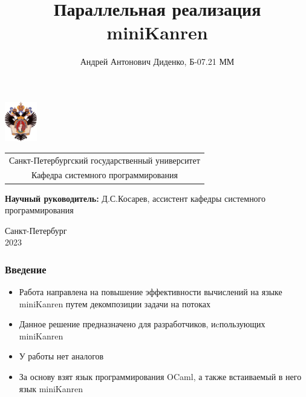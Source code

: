 \documentclass[aspectratio=169]{beamer}
\title[Параллелизация miniKanren]{Параллельная реализация miniKanren}
\institute[СПбГУ]{}
\author[Андрей Диденко]{Андрей Антонович Диденко, Б-07.21 ММ }
\begin{document}
{
\begin{frame}
	\includegraphics[width=1.4cm]{pictures/SPbGU_Logo.png}
	\vspace{-35pt}
	\hspace{-10pt}
	\begin{center}
		\begin{tabular}{c}
			\scriptsize{Санкт-Петербургский государственный университет} \\
			\scriptsize{Кафедра системного программирования}
		\end{tabular}
		\titlepage
	\end{center}

	\btVFill

	{\scriptsize
		{\bfseries Научный руководитель:} Д.С.Косарев, ассистент кафедры системного программирования \\
	}
	\begin{center}
		\vspace{5pt}
		\scriptsize{Санкт-Петербург\\
			2023}
	\end{center}

\end{frame}
}

\begin{frame}[fragile]
	\frametitle{Введение}
	\begin{itemize}
		\item Работа направлена на повышение эффективности вычислений на языке miniKanren путем декомпозиции задачи на потоках
		\item Данное решение предназначено для разработчиков, иcпользующих miniKanren
		\item У работы нет аналогов
		\item За основу взят язык программирования OCaml, а также встаиваемый в него язык miniKanren
	\end{itemize}
\end{frame}
\end{document}
